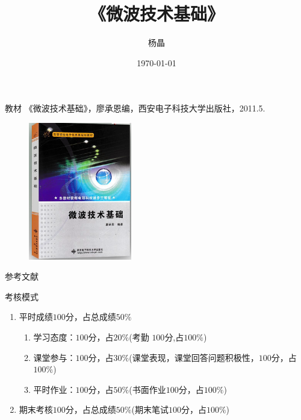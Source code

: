 \documentclass{ctexbeamer}
\begin{document}
\begin{frame}
 \title{《微波技术基础》}
 \author{杨晶}
 \date{\today}
 \titlepage
\end{frame}

\begin{frame}{教材}
 《微波技术基础》，廖承恩编，西安电子科技大学出版社，2011.5.
 \begin{figure}
  \centering
  \includegraphics[height=6cm]{jiaocai2}
 \end{figure}
\end{frame}

\begin{frame}{参考文献}
 
 \nocite{Zhao}
 \nocite{Wu}
 \nocite{Colin}
 \nocite{Liang}
 
\end{frame}

\begin{frame}{考核模式}
 \begin{enumerate}
  \item 平时成绩$100$分，占总成绩$50\%$
        \begin{enumerate}
         \item 学习态度：$100$分，占$20\%$(考勤 $100$分,占$100\%$)
         \item 课堂参与：$100$分，占$30\%$(课堂表现，课堂回答问题积极性，$100$分，占$100\%$)
         \item 平时作业：$100$分，占$50\%$(书面作业$100$分，占$100\%$)
        \end{enumerate}
  \item 期末考核$100$分，占总成绩$50\%$(期末笔试$100$分，占$100\%$)
 \end{enumerate}
\end{frame}










\end{document}
